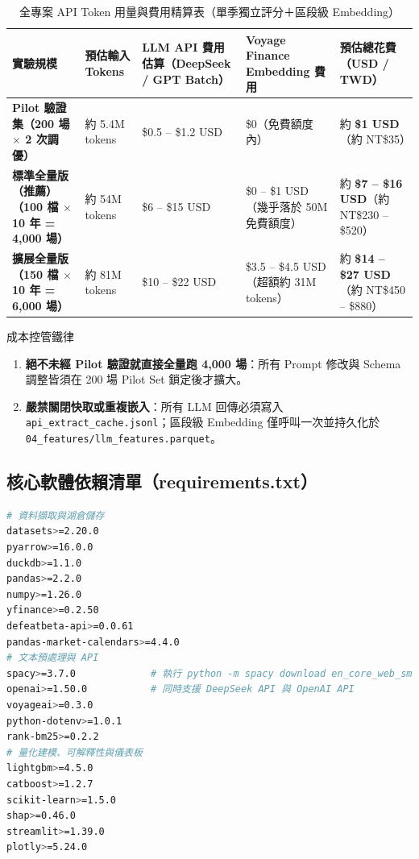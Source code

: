 \documentclass[11pt, a4paper]{article}
\begin{document}
\begin{table}[H]
\centering
\caption{全專案 API Token 用量與費用精算表（單季獨立評分＋區段級 Embedding）}
\label{tab:budget}
\footnotesize
\begin{tabularx}{\textwidth}{>{\bfseries}P{3.2cm} P{2.4cm} P{3.3cm} P{3.2cm} Y}
\toprule
實驗規模 & 預估輸入 Tokens & LLM API 費用估算（DeepSeek / GPT Batch） & Voyage Finance Embedding 費用 & 預估總花費（USD / TWD） \\
\midrule
Pilot 驗證集\newline（200 場 $\times$ 2 次調優） &
約 5.4M tokens &
\$0.5 -- \$1.2 USD &
\$0（免費額度內） &
約 \textbf{\$1 USD}\newline（約 NT\$35） \\
\midrule
標準全量版（推薦）\newline（100 檔 $\times$ 10 年 = 4,000 場） &
約 54M tokens &
\$6 -- \$15 USD &
\$0 -- \$1 USD\newline（幾乎落於 50M 免費額度） &
約 \textbf{\$7 -- \$16 USD}\newline（約 NT\$230 -- \$520） \\
\midrule
擴展全量版\newline（150 檔 $\times$ 10 年 = 6,000 場） &
約 81M tokens &
\$10 -- \$22 USD &
\$3.5 -- \$4.5 USD\newline（超額約 31M tokens） &
約 \textbf{\$14 -- \$27 USD}\newline（約 NT\$450 -- \$880） \\
\bottomrule
\end{tabularx}
\end{table}

\begin{warnbox}{成本控管鐵律}
\begin{enumerate}[leftmargin=1.4em, itemsep=1pt]
    \item \textbf{絕不未經 Pilot 驗證就直接全量跑 4,000 場}：所有 Prompt 修改與 Schema 調整皆須在 200 場 Pilot Set 鎖定後才擴大。
    \item \textbf{嚴禁關閉快取或重複嵌入}：所有 LLM 回傳必須寫入 \texttt{api\_extract\_cache.jsonl}；區段級 Embedding 僅呼叫一次並持久化於 \texttt{04\_features/llm\_features.parquet}。
\end{enumerate}
\end{warnbox}

\subsection{核心軟體依賴清單（requirements.txt）}
\begin{lstlisting}[language=bash, basicstyle=\ttfamily\scriptsize\color{TextDark}]
# 資料擷取與湖倉儲存
datasets>=2.20.0
pyarrow>=16.0.0
duckdb>=1.1.0
pandas>=2.2.0
numpy>=1.26.0
yfinance>=0.2.50
defeatbeta-api>=0.0.61
pandas-market-calendars>=4.4.0
# 文本預處理與 API
spacy>=3.7.0             # 執行 python -m spacy download en_core_web_sm
openai>=1.50.0           # 同時支援 DeepSeek API 與 OpenAI API
voyageai>=0.3.0
python-dotenv>=1.0.1
rank-bm25>=0.2.2
# 量化建模、可解釋性與儀表板
lightgbm>=4.5.0
catboost>=1.2.7
scikit-learn>=1.5.0
shap>=0.46.0
streamlit>=1.39.0
plotly>=5.24.0
\end{lstlisting}
\end{document}
